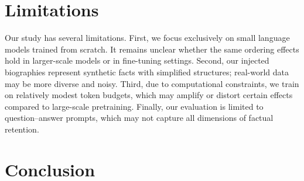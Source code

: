 \documentclass[11pt]{article}
\begin{document}
    \section{Limitations}
    Our study has several limitations. First, we focus exclusively on small language models trained from scratch. It remains unclear whether the same ordering effects hold in larger-scale models or in fine-tuning settings. Second, our injected biographies represent synthetic facts with simplified structures; real-world data may be more diverse and noisy. Third, due to computational constraints, we train on relatively modest token budgets, which may amplify or distort certain effects compared to large-scale pretraining. Finally, our evaluation is limited to question–answer prompts, which may not capture all dimensions of factual retention.

    \section{Conclusion}

    
    
\end{document}
